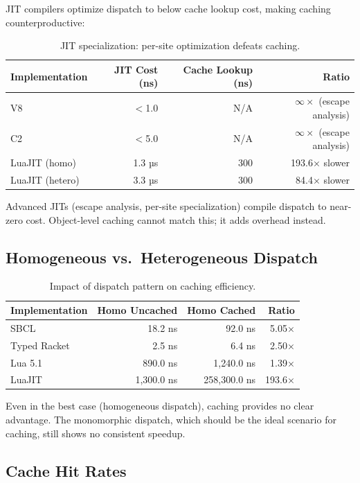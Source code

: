 \documentclass[sigplan,final]{acmart}
\begin{document}
JIT compilers optimize dispatch to below cache lookup cost, making caching counterproductive:

\begin{table}[h]
\centering
\caption{JIT specialization: per-site optimization defeats caching.}
\label{tab:mode3}
\begin{tabular}{@{}lrrr@{}}
\toprule
\textbf{Implementation} & \textbf{JIT Cost (ns)} & \textbf{Cache Lookup (ns)} & \textbf{Ratio} \\
\midrule
V8 & $<$1.0 & N/A & $\infty \times$ (escape analysis) \\
C2 & $<$5.0 & N/A & $\infty \times$ (escape analysis) \\
LuaJIT (homo) & 1.3 µs & 300 & 193.6× slower \\
LuaJIT (hetero) & 3.3 µs & 300 & 84.4× slower \\
\bottomrule
\end{tabular}
\end{table}

Advanced JITs (escape analysis, per-site specialization) compile dispatch to near-zero cost.
Object-level caching cannot match this; it adds overhead instead.

\subsection{Homogeneous vs.~Heterogeneous Dispatch}

\begin{table}[h]
\centering
\caption{Impact of dispatch pattern on caching efficiency.}
\label{tab:homo-hetero}
\begin{tabular}{@{}lrrr@{}}
\toprule
\textbf{Implementation} & \textbf{Homo Uncached} & \textbf{Homo Cached} & \textbf{Ratio} \\
\midrule
SBCL & 18.2 ns & 92.0 ns & 5.05× \\
Typed Racket & 2.5 ns & 6.4 ns & 2.50× \\
Lua 5.1 & 890.0 ns & 1,240.0 ns & 1.39× \\
LuaJIT & 1,300.0 ns & 258,300.0 ns & 193.6× \\
\bottomrule
\end{tabular}
\end{table}

Even in the best case (homogeneous dispatch), caching provides no clear advantage. The
monomorphic dispatch, which should be the ideal scenario for caching, still shows no consistent
speedup.

\subsection{Cache Hit Rates}
\end{document}
